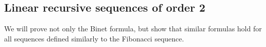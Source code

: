 \subsection{Linear recursive sequences of order 2}
We will prove not only the Binet formula, but show that similar formulas hold for all sequences defined similarly to the Fibonacci sequence.
